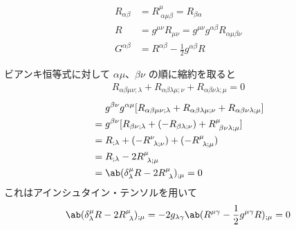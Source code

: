\documentclass[uplatex,dvipdfmx,a4paper,11pt]{jlreq}
\theoremstyle{definition}
\begin{document}
\begin{definition}
  \begin{align}
    R_{\alpha\beta} & = R^\mu_{\ \alpha\mu\beta} = R_{\beta\alpha}                            \\
    R               & = g^{\mu\nu}R_{\mu\nu} = g^{\mu\nu}g^{\alpha\beta}R_{\alpha\mu\beta\nu} \\
    G^{\alpha\beta} & = R^{\alpha\beta} - \frac{1}{2}g^{\alpha\beta}R
  \end{align}
\end{definition}
ビアンキ恒等式に対して $\alpha\mu$、$\beta\nu$ の順に縮約を取ると
\begin{align}
  R_{\alpha\beta\mu\nu;\lambda} + R_{\alpha\beta\lambda\mu;\nu} + R_{\alpha\beta\nu\lambda;\mu} = 0
\end{align}
\begin{align}
   & \quad\ g^{\beta\nu}g^{\alpha\mu}[R_{\alpha\beta\mu\nu;\lambda} + R_{\alpha\beta\lambda\mu;\nu} + R_{\alpha\beta\nu\lambda;\mu}] \\
   & = g^{\beta\nu}[R_{\beta\nu;\lambda} + (- R_{\beta\lambda;\nu}) + R^\mu_{\ \beta\nu\lambda;\mu}]                                 \\
   & = R_{;\lambda} + (- R^\nu_{\ \lambda;\nu}) + (-R^\mu_{\ \lambda;\mu})                                                           \\
   & = R_{;\lambda} - 2R^\mu_{\ \lambda;\mu}                                                                                         \\
   & = \ab(\delta^\mu_\lambda R - 2R^\mu_{\ \lambda})_{;\mu} = 0
\end{align}
これはアインシュタイン・テンソルを用いて
\begin{align}
  \ab(\delta^\mu_\lambda R - 2R^\mu_{\ \lambda})_{;\mu} = -2g_{\lambda\gamma}\ab(R^{\mu\gamma} - \frac{1}{2}g^{\mu\gamma}R)_{;\mu} = 0
\end{align}
\end{document}
